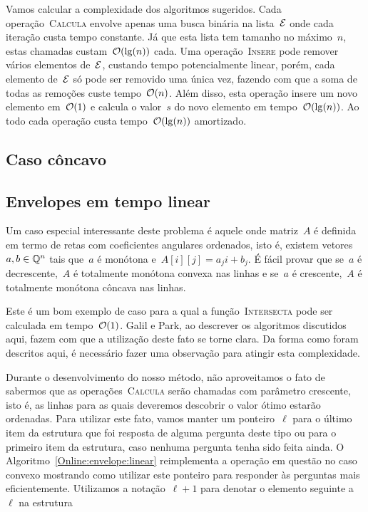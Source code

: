 Vamos calcular a complexidade dos algoritmos sugeridos. Cada operação~\textsc{Calcula} envolve apenas uma busca binária na lista~$\mathcal{E}$ onde cada iteração custa tempo constante. Já que esta lista tem tamanho no máximo~$n$, estas chamadas custam~$\mathcal{O}(\lg(n))$ cada. Uma operação~\textsc{Insere} pode remover vários elementos de~$\mathcal{E}$, custando tempo potencialmente linear, porém, cada elemento de~$\mathcal{E}$ só pode ser removido uma única vez, fazendo com que a soma de todas as remoções custe tempo~$\mathcal{O}(n)$. Além disso, esta operação insere um novo elemento em~$\mathcal{O}(1)$ e calcula o valor~$s$ do novo elemento em tempo~$\mathcal{O}(\lg(n))$. Ao todo cada operação custa tempo~$\mathcal{O}(\lg(n))$ amortizado.


\subsection{Caso côncavo} \label{Online:concave}




\subsection{Envelopes em tempo linear} \label{Online:linear}

Um caso especial interessante deste problema é aquele onde matriz~$A$ é definida em termo de retas com coeficientes angulares ordenados, isto é, existem vetores~$a,b \in \mathbb{Q}^n$ tais que~$a$ é monótona e~$A[i][j] = a_j i + b_j$. É fácil provar que se~$a$ é decrescente,~$A$ é totalmente monótona convexa nas linhas e se~$a$ é crescente,~$A$ é totalmente monótona côncava nas linhas.

Este é um bom exemplo de caso para a qual a função~\textsc{Intersecta} pode ser calculada em tempo~$\mathcal{O}(1)$. Galil e Park, ao descrever os algoritmos discutidos aqui, fazem com que a utilização deste fato se torne clara. Da forma como foram descritos aqui, é necessário fazer uma observação para atingir esta complexidade.

Durante o desenvolvimento do nosso método, não aproveitamos o fato de sabermos que as operações~\textsc{Calcula} serão chamadas com parâmetro crescente, isto é, as linhas para as quais deveremos descobrir o valor ótimo estarão ordenadas. Para utilizar este fato, vamos manter um ponteiro~$\ell$ para o último item da estrutura que foi resposta de alguma pergunta deste tipo ou para o primeiro item da estrutura, caso nenhuma pergunta tenha sido feita ainda. O Algoritmo~\ref{Online:envelope:linear} reimplementa a operação em questão no caso convexo mostrando como utilizar este ponteiro para responder às perguntas mais eficientemente. Utilizamos a notação~$\ell + 1$ para denotar o elemento seguinte a~$\ell$ na estrutura

